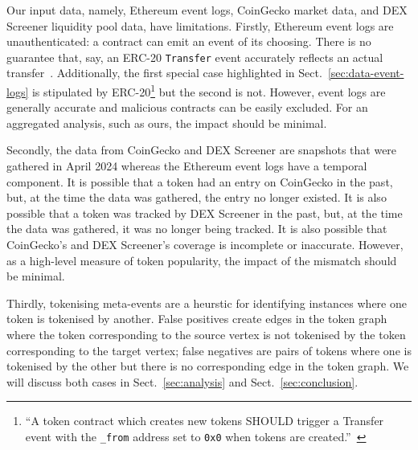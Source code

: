Our input data, namely, Ethereum event logs, CoinGecko market data,
and DEX Screener liquidity pool data, have limitations.  Firstly,
Ethereum event logs are unauthenticated: a contract can emit an event
of its choosing.  There is no guarantee that, say, an ERC-20
\texttt{Transfer} event accurately reflects an actual
transfer~\cite{guidi-michienzi-22}.  Additionally, the first special
case highlighted in Sect.~\ref{sec:data-event-logs} is stipulated by
ERC-20\footnote{``A token contract which creates new tokens SHOULD
trigger a Transfer event with the \texttt{\_from} address set to
\texttt{0x0} when tokens are
created.''~\cite{vogelsteller-buterin-15}} but the second is not.
However, event logs are generally accurate and malicious contracts can
be easily excluded.  For an aggregated analysis, such as ours, the
impact should be minimal.

Secondly, the data from CoinGecko and DEX Screener are snapshots that
were gathered in April 2024 whereas the Ethereum event logs have a
temporal component.  It is possible that a token had an entry on
CoinGecko in the past, but, at the time the data was gathered, the
entry no longer existed.  It is also possible that a token was tracked
by DEX Screener in the past, but, at the time the data was gathered,
it was no longer being tracked.  It is also possible that CoinGecko's
and DEX Screener's coverage is incomplete or inaccurate.  However, as
a high-level measure of token popularity, the impact of the mismatch
should be minimal.

Thirdly, tokenising meta-events are a heurstic for identifying
instances where one token is tokenised by another.  False positives
create edges in the token graph where the token corresponding to the
source vertex is not tokenised by the token corresponding to the
target vertex; false negatives are pairs of tokens where one is
tokenised by the other but there is no corresponding edge in the token
graph.  We will discuss both cases in Sect.~\ref{sec:analysis} and
Sect.~\ref{sec:conclusion}.
